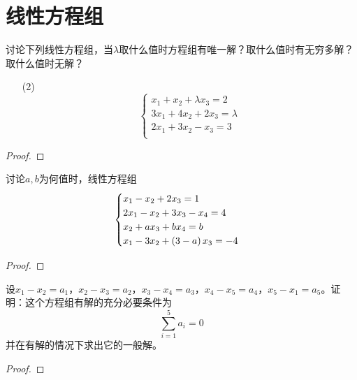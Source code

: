 \section{线性方程组}

\setcounter{problem}{3}
\begin{problem}
讨论下列线性方程组，当\(\lambda\)取什么值时方程组有唯一解？取什么值时有无穷多解？取什么值时无解？
\begin{enumerate}
    \item[(2)]
        {
        \begin{equation*}
            \begin{cases}
                x_1+x_2+\lambda x_3=2  \\
                3x_1+4x_2+2x_3=\lambda \\
                2x_1+3x_2-x_3=3        \\
            \end{cases}
        \end{equation*}
        }
\end{enumerate}
\end{problem}
\begin{proof}

\end{proof}

\begin{problem}
讨论\(a,b\)为何值时，线性方程组
\begin{equation*}
    \begin{cases}
        x_1-x_2+2x_3=1             \\
        2x_1-x_2+3x_3-x_4=4        \\
        x_2+ax_3+bx_4=b            \\
        x_1-3x_2+\left( 3-a \right)x_3=-4 \\
    \end{cases}
\end{equation*}
\end{problem}
\begin{proof}

\end{proof}

\begin{problem}
设\(x_1-x_2=a_1\)，\(x_2-x_3=a_2\)，\(x_3-x_4=a_3\)，\(x_4-x_5=a_4\)，\(x_5-x_1=a_5\)。证明：这个方程组有解的充分必要条件为
\begin{equation*}
    \sum_{i=1}^5a_i=0
\end{equation*}
并在有解的情况下求出它的一般解。
\end{problem}
\begin{proof}

\end{proof}

